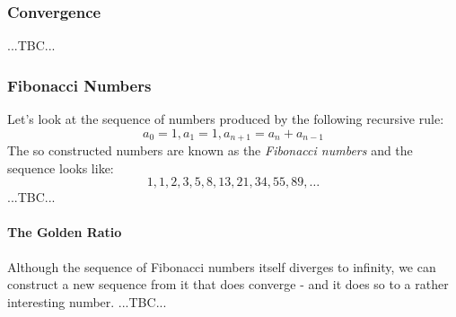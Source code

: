 


\subsubsection{Convergence}
...TBC...

\subsubsection{Fibonacci Numbers}
Let's look at the sequence of numbers produced by the following recursive rule:
\begin{equation}
a_0 = 1, a_1 = 1, a_{n+1} = a_n + a_{n-1}
\end{equation}
The so constructed numbers are known as the \emph{Fibonacci numbers} and the sequence looks like:
\begin{equation}
1,1,2,3,5,8,13,21,34,55,89,\ldots
\end{equation}
...TBC...



\paragraph{The Golden Ratio}
Although the sequence of Fibonacci numbers itself diverges to infinity, we can construct a new sequence from it that does converge - and it does so to a rather interesting number. ...TBC...



